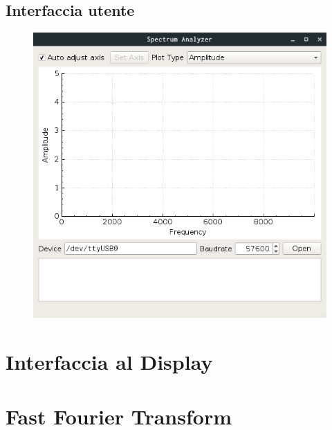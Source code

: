 \subsection{Interfaccia utente}
\begin{figure}[H] \centering
	\includegraphics[width=.5\textwidth]{figures/screenshots/desktop-debian-empty}
\end{figure}

\section{Interfaccia al Display}

\section{Fast Fourier Transform}
